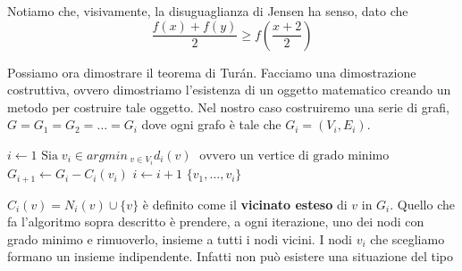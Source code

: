 \documentclass[12pt]{report}
\begin{document}
\vspace{5px}
\noindent 
Notiamo che, visivamente, la disuguaglianza di Jensen ha senso, dato che $$\frac{f(x) + f(y)}{2} \geq f(\frac{x+2}{2})$$

\begin{dimo}
    Possiamo ora dimostrare il teorema di Turán. Facciamo una dimostrazione costruttiva, ovvero dimostriamo l'esistenza di un oggetto matematico creando un metodo per costruire tale oggetto. Nel nostro caso costruiremo una serie di grafi, $G = G_1 = G_2 = \dots = G_i$ dove ogni grafo è tale che $G_i = (V_i,E_i)$.

\begin{algorithm}
\caption{}\label{euclid}
\begin{algorithmic}[1]
\State $i \gets 1$
\State $\text{Sia} \; v_i \in argmin_{\;v \in V_i} d_i(v) \;$ $\text{ovvero un vertice di grado}$ $\text{minimo}$
\State $G_{i+1} \gets G_i - C_i(v_i)$
\State $i \gets i + 1$
\EndWhile
\State \Return $\{v_1,\dots,v_i\}$
\end{algorithmic}
\end{algorithm}

\noindent 
$C_i(v) = N_i(v) \cup \{v\}$ è definito come il \textbf{vicinato esteso} di $v$ in $G_i$. Quello che fa l'algoritmo sopra descritto è prendere, a ogni iterazione, uno dei nodi con grado minimo e rimuoverlo, insieme a tutti i nodi vicini.
I nodi $v_i$ che scegliamo formano un insieme indipendente. Infatti non può esistere una situazione del tipo

\vspace{5px}



\end{dimo}
\end{document}
